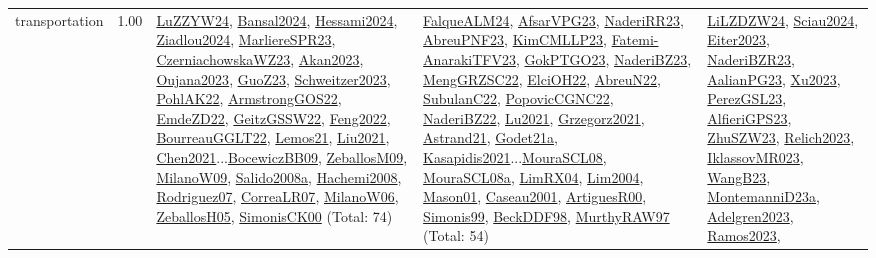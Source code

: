 {\begin{longtable}{p{3cm}r>{\raggedright\arraybackslash}p{6cm}>{\raggedright\arraybackslash}p{6cm}>{\raggedright\arraybackslash}p{8cm}}
\index{transportation}\index{Concepts!transportation}transportation &  1.00 & \hyperref[detail:LuZZYW24]{LuZZYW24}, \hyperref[detail:Bansal2024]{Bansal2024}, \hyperref[detail:Hessami2024]{Hessami2024}, \hyperref[detail:Ziadlou2024]{Ziadlou2024}, \hyperref[detail:MarliereSPR23]{MarliereSPR23}, \hyperref[detail:CzerniachowskaWZ23]{CzerniachowskaWZ23}, \hyperref[detail:Akan2023]{Akan2023}, \hyperref[detail:Oujana2023]{Oujana2023}, \hyperref[detail:GuoZ23]{GuoZ23}, \hyperref[detail:Schweitzer2023]{Schweitzer2023}, \hyperref[detail:PohlAK22]{PohlAK22}, \hyperref[detail:ArmstrongGOS22]{ArmstrongGOS22}, \hyperref[detail:EmdeZD22]{EmdeZD22}, \hyperref[detail:GeitzGSSW22]{GeitzGSSW22}, \hyperref[detail:Feng2022]{Feng2022}, \hyperref[detail:BourreauGGLT22]{BourreauGGLT22}, \hyperref[detail:Lemos21]{Lemos21}, \hyperref[detail:Liu2021]{Liu2021}, \hyperref[detail:Chen2021]{Chen2021}...\hyperref[detail:BocewiczBB09]{BocewiczBB09}, \hyperref[detail:ZeballosM09]{ZeballosM09}, \hyperref[detail:MilanoW09]{MilanoW09}, \hyperref[detail:Salido2008a]{Salido2008a}, \hyperref[detail:Hachemi2008]{Hachemi2008}, \hyperref[detail:Rodriguez07]{Rodriguez07}, \hyperref[detail:CorreaLR07]{CorreaLR07}, \hyperref[detail:MilanoW06]{MilanoW06}, \hyperref[detail:ZeballosH05]{ZeballosH05}, \hyperref[detail:SimonisCK00]{SimonisCK00} (Total: 74) & \hyperref[detail:FalqueALM24]{FalqueALM24}, \hyperref[detail:AfsarVPG23]{AfsarVPG23}, \hyperref[detail:NaderiRR23]{NaderiRR23}, \hyperref[detail:AbreuPNF23]{AbreuPNF23}, \hyperref[detail:KimCMLLP23]{KimCMLLP23}, \hyperref[detail:Fatemi-AnarakiTFV23]{Fatemi-AnarakiTFV23}, \hyperref[detail:GokPTGO23]{GokPTGO23}, \hyperref[detail:NaderiBZ23]{NaderiBZ23}, \hyperref[detail:MengGRZSC22]{MengGRZSC22}, \hyperref[detail:ElciOH22]{ElciOH22}, \hyperref[detail:AbreuN22]{AbreuN22}, \hyperref[detail:SubulanC22]{SubulanC22}, \hyperref[detail:PopovicCGNC22]{PopovicCGNC22}, \hyperref[detail:NaderiBZ22]{NaderiBZ22}, \hyperref[detail:Lu2021]{Lu2021}, \hyperref[detail:Grzegorz2021]{Grzegorz2021}, \hyperref[detail:Astrand21]{Astrand21}, \hyperref[detail:Godet21a]{Godet21a}, \hyperref[detail:Kasapidis2021]{Kasapidis2021}...\hyperref[detail:MouraSCL08]{MouraSCL08}, \hyperref[detail:MouraSCL08a]{MouraSCL08a}, \hyperref[detail:LimRX04]{LimRX04}, \hyperref[detail:Lim2004]{Lim2004}, \hyperref[detail:Mason01]{Mason01}, \hyperref[detail:Caseau2001]{Caseau2001}, \hyperref[detail:ArtiguesR00]{ArtiguesR00}, \hyperref[detail:Simonis99]{Simonis99}, \hyperref[detail:BeckDDF98]{BeckDDF98}, \hyperref[detail:MurthyRAW97]{MurthyRAW97} (Total: 54) & \hyperref[detail:LiLZDZW24]{LiLZDZW24}, \hyperref[detail:Sciau2024]{Sciau2024}, \hyperref[detail:Eiter2023]{Eiter2023}, \hyperref[detail:NaderiBZR23]{NaderiBZR23}, \hyperref[detail:AalianPG23]{AalianPG23}, \hyperref[detail:Xu2023]{Xu2023}, \hyperref[detail:PerezGSL23]{PerezGSL23}, \hyperref[detail:AlfieriGPS23]{AlfieriGPS23}, \hyperref[detail:ZhuSZW23]{ZhuSZW23}, \hyperref[detail:Relich2023]{Relich2023}, \hyperref[detail:IklassovMR023]{IklassovMR023}, \hyperref[detail:WangB23]{WangB23}, \hyperref[detail:MontemanniD23a]{MontemanniD23a}, \hyperref[detail:Adelgren2023]{Adelgren2023}, \hyperref[detail:Ramos2023]{Ramos2023}, 
\end{longtable}}
